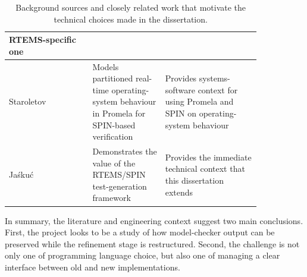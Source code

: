 \begin{table}[H]
\begin{center}
\begin{tabular}{|p{0.28\linewidth}|p{0.24\linewidth}|p{0.32\linewidth}|}
RTEMS-specific one \\
\hline
Staroletov \citep{staroletov2020promela} & Models partitioned
real-time operating-system behaviour in Promela for SPIN-based
verification & Provides systems-software context for using Promela and
SPIN on operating-system behaviour \\
\hline
Ja{\'s}ku{\'c} \citep{jaskuc2022barrier} & Demonstrates the value of
the RTEMS/SPIN test-generation framework & Provides the immediate
technical context that this dissertation extends \\
\hline
\end{tabular}
\end{center}
\caption[Context for the dissertation]{Background sources and closely
related work that motivate the technical choices made in the
dissertation.}
\label{tab:state-of-the-art-context}
\end{table}

In summary, the literature and engineering context suggest two main conclusions. First, the project looks to be a study of how model-checker output can be preserved while the refinement stage is restructured. Second, the challenge is not only one of programming language choice, but also one of managing a clear interface between old and new implementations.

